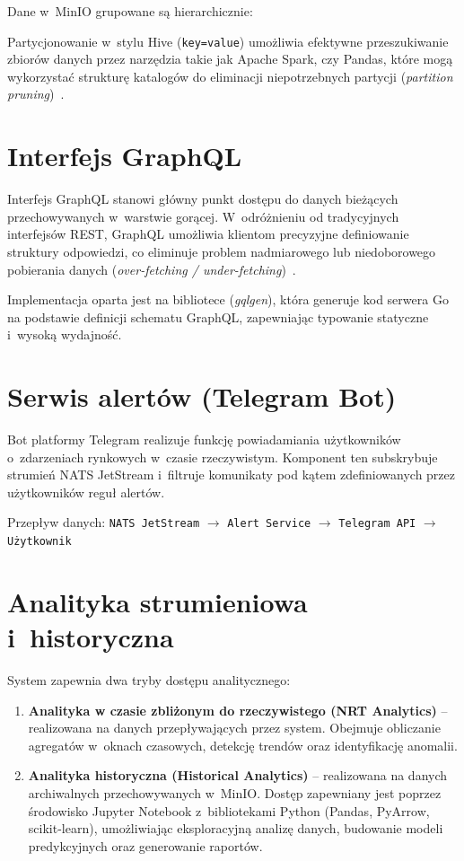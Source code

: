Dane w~MinIO grupowane są hierarchicznie:

Partycjonowanie w~stylu Hive (\texttt{key=value}) umożliwia efektywne przeszukiwanie zbiorów danych przez narzędzia
takie jak Apache Spark, czy Pandas, które mogą wykorzystać strukturę katalogów do eliminacji niepotrzebnych
partycji (\textit{partition pruning})~\cite{hive_partitioning}.


\section{Interfejs GraphQL}
\label{sec:graphql}

Interfejs GraphQL stanowi główny punkt dostępu do danych bieżących przechowywanych w~warstwie gorącej.
W~odróżnieniu od tradycyjnych interfejsów REST, GraphQL umożliwia klientom precyzyjne definiowanie struktury
odpowiedzi, co eliminuje problem nadmiarowego lub niedoborowego pobierania danych (\textit{over-fetching /
under-fetching})~\cite{graphql_rest_comparative}.

Implementacja oparta jest na bibliotece (\textit{gqlgen}), która generuje kod serwera Go na podstawie definicji schematu
GraphQL, zapewniając typowanie statyczne i~wysoką wydajność.


\section{Serwis alertów (Telegram Bot)}
\label{sec:telegram_bot}

Bot platformy Telegram realizuje funkcję powiadamiania użytkowników o~zdarzeniach rynkowych w~czasie rzeczywistym.
Komponent ten subskrybuje strumień NATS JetStream i~filtruje komunikaty pod kątem zdefiniowanych przez użytkowników
reguł alertów.

Przepływ danych: \texttt{NATS JetStream} $\rightarrow$ \texttt{Alert Service} $\rightarrow$ \texttt{Telegram API}
$\rightarrow$ \texttt{Użytkownik}


\section[Analityka strumieniowa i historyczna]{Analityka strumieniowa i~historyczna}
\label{sec:analityka}

System zapewnia dwa tryby dostępu analitycznego:

\begin{enumerate}
    \item \textbf{Analityka w czasie zbliżonym do rzeczywistego (NRT Analytics)} -- realizowana na danych
    przepływających przez system.
    Obejmuje obliczanie agregatów w~oknach czasowych, detekcję trendów oraz identyfikację anomalii.
    \item \textbf{Analityka historyczna (Historical Analytics)} -- realizowana na danych archiwalnych
    przechowywanych w~MinIO\@.
    Dostęp zapewniany jest poprzez środowisko Jupyter Notebook z~bibliotekami Python (Pandas, PyArrow, scikit-learn),
    umożliwiając eksploracyjną analizę danych, budowanie modeli predykcyjnych oraz generowanie raportów.
\end{enumerate}


